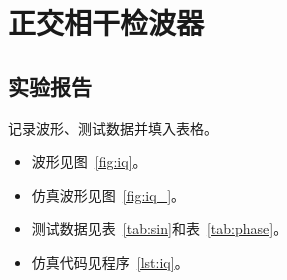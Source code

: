 \documentclass[../main]{subfiles}
\begin{document}
\chapter{正交相干检波器}%
\label{cha:iq}

\section{实验报告}%
\label{sec:\arabic{chapter}report}

\begin{Exercise}
  记录波形、测试数据并填入表格。
\end{Exercise}

\begin{Answer}
  \begin{itemize}
    \item 波形见图~\ref{fig:iq}。
    \item 仿真波形见图~\ref{fig:iq_}。
    \item 测试数据见表~\ref{tab:sin}和表~\ref{tab:phase}。
    \item 仿真代码见程序~\ref{lst:iq}。
  \end{itemize}
\end{Answer}
\end{document}
